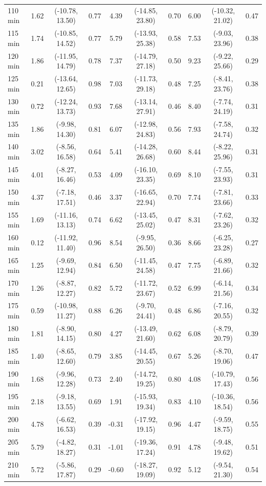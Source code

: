 \begin{table}[ht]
{\begin{tabular}{lccccccccc}
110 min & 1.62 & (-10.78, 13.50) & 0.77 & 4.39 & (-14.85, 23.80) & 0.70 & 6.00 & (-10.32, 21.02) & 0.47 \\
115 min & 1.74 & (-10.85, 14.52) & 0.77 & 5.79 & (-13.93, 25.38) & 0.58 & 7.53 & (-9.03, 23.96) & 0.38 \\
120 min & 1.86 & (-11.95, 14.79) & 0.78 & 7.37 & (-14.79, 27.18) & 0.50 & 9.23 & (-9.22, 25.66) & 0.29 \\
125 min & 0.21 & (-13.64, 12.65) & 0.98 & 7.03 & (-11.73, 29.18) & 0.48 & 7.25 & (-8.41, 23.76) & 0.38 \\
130 min & 0.72 & (-12.24, 13.73) & 0.93 & 7.68 & (-13.14, 27.91) & 0.46 & 8.40 & (-7.74, 24.19) & 0.31 \\
135 min & 1.86 & (-9.98, 14.30) & 0.81 & 6.07 & (-12.98, 24.83) & 0.56 & 7.93 & (-7.58, 24.74) & 0.32 \\
140 min & 3.02 & (-8.56, 16.58) & 0.64 & 5.41 & (-14.28, 26.68) & 0.60 & 8.44 & (-8.22, 25.96) & 0.31 \\
145 min & 4.01 & (-8.27, 16.46) & 0.53 & 4.09 & (-16.10, 23.35) & 0.69 & 8.10 & (-7.55, 23.93) & 0.31 \\
150 min & 4.37 & (-7.18, 17.51) & 0.46 & 3.37 & (-16.65, 22.94) & 0.70 & 7.74 & (-7.81, 23.66) & 0.33 \\
155 min & 1.69 & (-11.16, 13.13) & 0.74 & 6.62 & (-13.45, 25.02) & 0.47 & 8.31 & (-7.62, 23.26) & 0.32 \\
160 min & 0.12 & (-11.92, 11.40) & 0.96 & 8.54 & (-9.95, 26.50) & 0.36 & 8.66 & (-6.25, 23.28) & 0.27 \\
165 min & 1.25 & (-9.69, 12.94) & 0.84 & 6.50 & (-11.45, 24.58) & 0.47 & 7.75 & (-6.89, 21.66) & 0.32 \\
170 min & 1.26 & (-8.87, 12.27) & 0.82 & 5.72 & (-11.72, 23.67) & 0.52 & 6.99 & (-6.14, 21.56) & 0.34 \\
175 min & 0.59 & (-10.98, 11.27) & 0.88 & 6.26 & (-9.70, 24.41) & 0.48 & 6.86 & (-7.16, 20.55) & 0.32 \\
180 min & 1.81 & (-8.90, 14.15) & 0.80 & 4.27 & (-13.49, 21.60) & 0.62 & 6.08 & (-8.79, 20.79) & 0.39 \\
185 min & 1.40 & (-8.65, 12.60) & 0.79 & 3.85 & (-14.45, 20.55) & 0.67 & 5.26 & (-8.70, 19.06) & 0.47 \\
190 min & 1.68 & (-9.96, 12.28) & 0.73 & 2.40 & (-14.72, 19.25) & 0.80 & 4.08 & (-10.79, 17.43) & 0.56 \\
195 min & 2.18 & (-9.18, 13.55) & 0.69 & 1.91 & (-15.93, 19.34) & 0.83 & 4.10 & (-10.36, 18.54) & 0.56 \\
200 min & 4.78 & (-6.62, 16.53) & 0.39 & -0.31 & (-17.92, 19.15) & 0.96 & 4.47 & (-9.59, 18.75) & 0.55 \\
205 min & 5.79 & (-4.82, 18.27) & 0.31 & -1.01 & (-19.36, 17.24) & 0.91 & 4.78 & (-9.48, 19.62) & 0.51 \\
210 min & 5.72 & (-5.86, 17.87) & 0.29 & -0.60 & (-18.27, 19.09) & 0.92 & 5.12 & (-9.54, 21.30) & 0.54 \\
\bottomrule
\end{tabular}%
}
\end{table}
